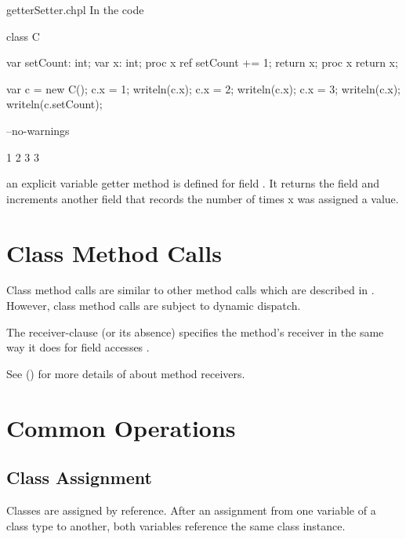 \begin{chapelexample}{getterSetter.chpl}
In the code
\begin{chapel}
class C {
  var setCount: int;
  var x: int;
  proc x ref {
    setCount += 1;
    return x;
  }
  proc x {
    return x;
  }

}
\end{chapel}
\begin{chapelpost}
var c = new C();
c.x = 1;
writeln(c.x);
c.x = 2;
writeln(c.x);
c.x = 3;
writeln(c.x);
writeln(c.setCount);
\end{chapelpost}
\begin{chapelcompopts}
--no-warnings
\end{chapelcompopts}
\begin{chapeloutput}
1
2
3
3
\end{chapeloutput}
an explicit variable getter method is defined for field .  It
returns the field  and increments another field that records
the number of times x was assigned a value.
\end{chapelexample}

\section{Class Method Calls}
\label{Class_Method_Calls}

Class method calls are similar to other method calls which are described
in . However, class method calls are subject to
dynamic dispatch.

The receiver-clause (or its absence) specifies the method's receiver in
the same way it does for field accesses .

See () for more details of about method
receivers.

\section{Common Operations}

\subsection{Class Assignment}
\label{Class_Assignment}

Classes are assigned by reference.  After an assignment from one
variable of a class type to another, both variables reference the same
class instance.

